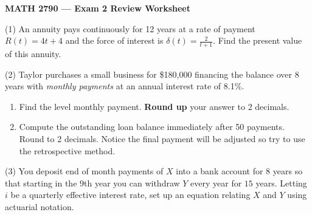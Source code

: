 \documentclass[11pt]{article}
\begin{document}
\begin{center}
    {\LARGE \textbf{MATH 2790 --- Exam 2 Review Worksheet}}\\[0.5ex]
\end{center}




\vspace{1em}


(1) An annuity pays continuously for 12 years at a rate of payment $R(t) = 4t + 4$ and the force of interest is 
\(\displaystyle \delta(t) = \frac{2}{t+1}\). Find the present value of this annuity.
\vspace{1em}


(2) Taylor purchases a small business for \$180{,}000 financing the balance over 8 years with \emph{monthly payments} at an annual interest rate of 8.1\%.

\begin{enumerate}[label=(\alph*)]
    \item Find the level monthly payment. \textbf{Round up} your answer to 2 decimals.
    \item Compute the outstanding loan balance immediately after 50 payments. Round to 2 decimals. Notice the final payment will be adjusted so try to use the retrospective method.
\end{enumerate}

\vspace{1em}


(3) \noindent
You deposit end of month payments of $X$ into a bank account for $8$ years so that starting in the $9$th year you can withdraw $Y$ every year for $15$ years. Letting $i$ be a quarterly effective interest rate, set up an equation relating $X$ and $Y$ using actuarial notation.

\vspace{1em}
\end{document}
